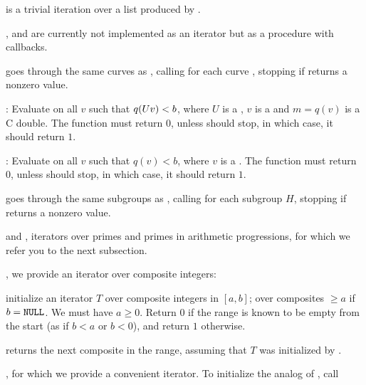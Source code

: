 \item {} is a trivial iteration over a list produced by
.

\item {},  and  are currently not
implemented as an iterator but as a procedure with callbacks.

goes through the same curves as , calling
 for each curve , stopping if  returns a
nonzero value.

:
Evaluate  on all $v$ such that $q(U\*v)<b$, where $U$ is a
, $v$ is a  and $m=q(v)$ is a C double. The function
 must return $0$, unless  should stop, in which case,
it should return $1$.

:
Evaluate  on all $v$ such that $q(v)<b$, where $v$ is a
. The function  must return $0$, unless 
should stop, in which case, it should return $1$.

goes through the same subgroups as , calling
 for each subgroup $H$, stopping if  returns a
nonzero value.

\item {} and , iterators over primes and
primes in arithmetic progressions, for which we refer you to the
next subsection.

\item {}, we provide an iterator over composite integers:

 initialize an
iterator $T$ over composite integers in $[a,b]$; over composites $\geq a$ if
$b = {\tt NULL}$. We must have $a\geq 0$. Return $0$ if the range is known to
be empty from the start (as if $b < a$ or $b < 0$), and return $1$ otherwise.

 returns the next composite in
the range, assuming that $T$ was initialized by .

\item {}, for which we provide a convenient iterator. To
initialize the analog of , call

